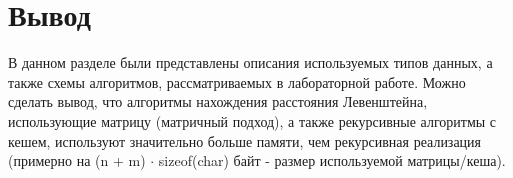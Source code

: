 \section{Вывод}
В данном разделе были представлены описания используемых типов данных, а также схемы алгоритмов, рассматриваемых в лабораторной работе. 
Можно сделать вывод, что алгоритмы нахождения расстояния Левенштейна, использующие матрицу (матричный подход), а также рекурсивные алгоритмы с кешем, используют значительно больше памяти, чем рекурсивная реализация (примерно на  (n + m) $ \cdot$ sizeof(char) байт - размер используемой матрицы/кеша).